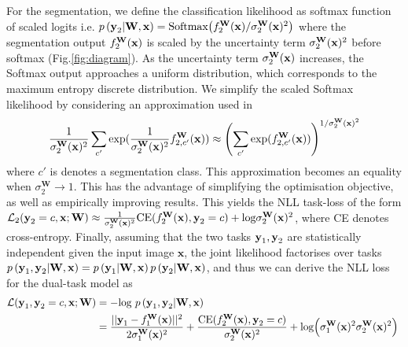 For the segmentation, we define the classification likelihood as softmax function of scaled logits i.e. $p\left(\text{\textbf{y}}_{2}|\textbf{W},\mathbf{x}\right) = \text{Softmax}\big{(}f_{2}^{\text{\textbf{W}}}(\text{\textbf{x}})/\sigma^{\mathbf{W}}_{2}(\text{\textbf{x}})^2\big{)}$ where the segmentation output $f_{2}^{\text{\textbf{W}}}(\text{\textbf{x}})$ is scaled by the uncertainty term $\sigma^{\mathbf{W}}_{2}(\text{\textbf{x}})^2$ before softmax (Fig.\ref{fig:diagram}). As the uncertainty term $\sigma^{\mathbf{W}}_{2}(\text{\textbf{x}})$ increases, the Softmax output approaches a uniform distribution, which corresponds to the maximum entropy discrete distribution. We simplify the scaled Softmax likelihood by considering an approximation used in \cite{kendall2017multi} 
$$\frac{1}{\sigma^{\mathbf{W}}_{2}(\text{\textbf{x}})^2}\sum_{c'}\text{exp}(\frac{1}{\sigma^{\mathbf{W}}_{2}(\text{\textbf{x}})^2}f^{\text{\textbf{W}}}_{2,c'}(\text{\textbf{x}})) \approx \left(\sum_{c'}\text{exp}(f^{\mathbf{W}}_{2,c'}(\text{\textbf{x}}))\right)^{1/\sigma^{\mathbf{W}}_{2}(\text{\textbf{x}})^2}$$ where $c'$ is denotes a segmentation class. This approximation becomes an equality
when $\sigma^{\mathbf{W}}_{2}\rightarrow 1$. This has the advantage of simplifying the
optimisation objective, as well as empirically improving results. This yields the NLL task-loss of the form $\mathcal{L}_{2}(\text{\textbf{y}}_{2}=c,\mathbf{x};\mathbf{W}) \approx \frac{1}{\sigma^{\mathbf{W}}_{2}(\text{\textbf{x}})^2} \text{CE}(f_{2}^{\text{\textbf{W}}}(\text{\textbf{x}}),\text{\textbf{y}}_{2}=c)+ \text{log}\sigma^{\mathbf{W}}_{2}(\text{\textbf{x}})^2$, where CE denotes cross-entropy.
Finally, assuming that the two tasks $\text{\textbf{y}}_{1},\text{\textbf{y}}_{2}$ are statistically independent given the input image $\mathbf{x}$,  the joint likelihood factorises over tasks  $p\left(\text{\textbf{y}}_{1},\text{\textbf{y}}_{2}|\mathbf{W},\mathbf{x}\right)=p\left(\text{\textbf{y}}_{1}|\mathbf{W},\mathbf{x}\right)p\left(\text{\textbf{y}}_{2}|\mathbf{W},\mathbf{x}\right)$, and thus we can derive the NLL loss for the dual-task model as
\begin{align}
\mathcal{L}(\textbf{y}_{1},\textbf{y}_{2}=c,\mathbf{x};\mathbf{W})
& = - \text{log } p\left(\text{\textbf{y}}_{1},\text{\textbf{y}}_{2}|\mathbf{W},\mathbf{x}\right)\\
&=\frac{||\text{\textbf{y}}_{1}-f^{\text{\textbf{W}}}_1(\text{\textbf{x}})||^{2}}{2\sigma_{1}^{\text{\textbf{W}}}(\text{\textbf{x}})^{2}} + \frac{\text{CE}(f_{2}^{\text{\textbf{W}}}(\text{\textbf{x}}),\text{\textbf{y}}_{2}=c)}{\sigma^{\mathbf{W}}_{2}(\text{\textbf{x}})^2} + \text{log}\Big{(}\sigma^{\mathbf{W}}_{1}(\text{\textbf{x}})^2\sigma^{\mathbf{W}}_{2}(\text{\textbf{x}})^2\Big{)}\;
\end{align}

